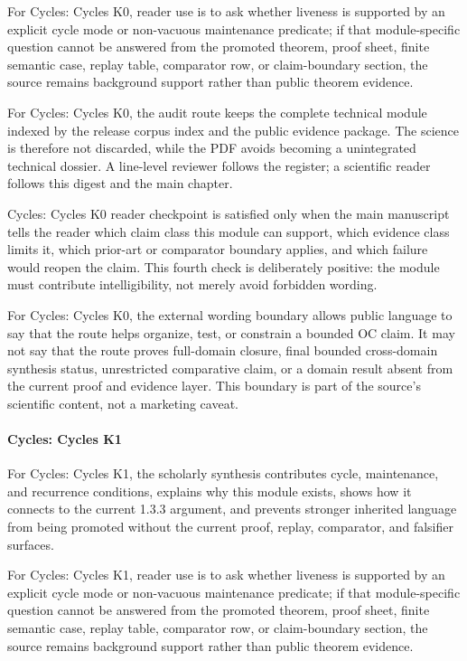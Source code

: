 For Cycles: Cycles K0, reader use is to ask whether liveness is supported by an explicit cycle mode or non-vacuous maintenance predicate; if that module-specific question cannot be answered from the promoted theorem, proof sheet, finite semantic case, replay table, comparator row, or claim-boundary section, the source remains background support rather than public theorem evidence.


For Cycles: Cycles K0, the audit route keeps the complete technical module indexed by the release corpus index and the public evidence package. The science is therefore not discarded, while the PDF avoids becoming a unintegrated technical dossier. A line-level reviewer follows the register; a scientific reader follows this digest and the main chapter.


Cycles: Cycles K0 reader checkpoint is satisfied only when the main manuscript tells the reader which claim class this module can support, which evidence class limits it, which prior-art or comparator boundary applies, and which failure would reopen the claim. This fourth check is deliberately positive: the module must contribute intelligibility, not merely avoid forbidden wording.


For Cycles: Cycles K0, the external wording boundary allows public language to say that the route helps organize, test, or constrain a bounded OC claim. It may not say that the route proves full-domain closure, final bounded cross-domain synthesis status, unrestricted comparative claim, or a domain result absent from the current proof and evidence layer. This boundary is part of the source's scientific content, not a marketing caveat.


\paragraph{Cycles: Cycles K1}

For Cycles: Cycles K1, the scholarly synthesis contributes cycle, maintenance, and recurrence conditions, explains why this module exists, shows how it connects to the current 1.3.3 argument, and prevents stronger inherited language from being promoted without the current proof, replay, comparator, and falsifier surfaces.


For Cycles: Cycles K1, reader use is to ask whether liveness is supported by an explicit cycle mode or non-vacuous maintenance predicate; if that module-specific question cannot be answered from the promoted theorem, proof sheet, finite semantic case, replay table, comparator row, or claim-boundary section, the source remains background support rather than public theorem evidence.


